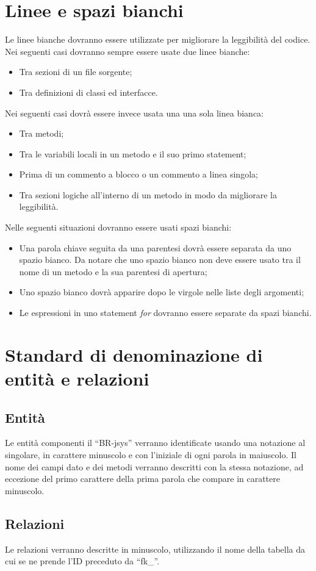 \section{Linee e spazi bianchi}
Le linee bianche dovranno essere utilizzate per migliorare la leggibilit\`a del codice. Nei seguenti casi dovranno sempre essere usate due linee bianche:
\begin{itemize}
\item Tra sezioni di un file sorgente;
\item Tra definizioni di classi ed interfacce.
\end{itemize}
Nei seguenti casi dovr\`a essere invece usata una una sola linea bianca:
\begin{itemize}
\item Tra metodi;
\item Tra le variabili locali in un metodo e il suo primo statement;
\item Prima di un commento a blocco o un commento a linea singola;
\item Tra sezioni logiche all'interno di un metodo in modo da migliorare la leggibilit\`a.
\end{itemize}
Nelle seguenti situazioni dovranno essere usati spazi bianchi:
\begin{itemize}
\item Una parola chiave seguita da una parentesi dovr\`a essere separata da uno spazio bianco. Da notare che uno spazio bianco non deve essere usato tra il nome di un metodo e la sua parentesi di apertura;
\item Uno spazio bianco dovr\`a apparire dopo le virgole nelle liste degli argomenti;
\item Le espressioni in uno statement \textit{for} dovranno essere separate da spazi bianchi.
\end{itemize}

\section{Standard di denominazione di entit\`a e relazioni}
\subsection{Entit\`a}
Le entit\`a componenti il ``BR-jsys'' verranno identificate usando una notazione al singolare, in carattere minuscolo e con l'iniziale di ogni parola in maiuscolo. Il nome dei campi dato e dei metodi verranno descritti con la stessa notazione, ad eccezione del primo carattere della prima parola che compare in carattere minuscolo.
\subsection{Relazioni}
Le relazioni verranno descritte in minuscolo, utilizzando il nome della tabella da cui se ne prende l'ID preceduto da ``fk\_''.



